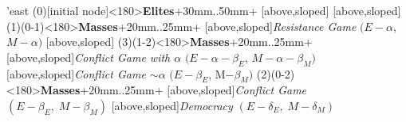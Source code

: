 	\begin{istgame}[font=\footnotesize]
	\centering
	\setistgrowdirection'{east}
	\xtShowArrows
	\istroot(0)[initial node]<180>{\textbf{Elites}}+30mm..50mm+
	[above,sloped]  [above,sloped] \endist
	\istroot(1)(0-1)<180>{\textbf{Masses}}+20mm..25mm+
	[above,sloped]{\textit{Resistance Game} $(E- \alpha$, $M-\alpha)$ }
	[above,sloped]{ }  \endist
	\istroot(3)(1-2)<180>{\textbf{Masses}}+20mm..25mm+
	[above,sloped]{\textit{Conflict Game with $\alpha$}
		$(E- \alpha- \beta_{E}$, $M-\alpha-\beta_{M})$}
	[above,sloped]{\textit{Conflict Game $\sim\alpha$} 
		$(E- \beta_{E}$, M$-\beta_{M})$} \endist
	\istroot(2)(0-2)<180>{\textbf{Masses}}+20mm..25mm+
	[above,sloped]{\textit{Conflict Game} $(E - \beta_{E},\; M-\beta_{M})$}
	[above,sloped]{\textit{Democracy} $(E -\delta_{E},\; M- \delta_{M})$} \endist
\end{istgame}